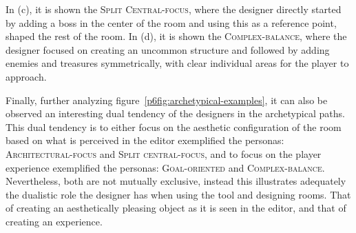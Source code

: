 In (c), it is shown the \textsc{Split Central-focus}, where the designer directly started by adding a boss in the center of the room and using this as a reference point, shaped the rest of the room. In (d), it is shown the \textsc{Complex-balance}, where the designer focused on creating an uncommon structure and followed by adding enemies and treasures symmetrically, with clear individual areas for the player to approach.


Finally, further analyzing figure~\ref{p6fig:archetypical-examples}, it can also be observed an interesting dual tendency of the designers in the archetypical paths. This dual tendency is to either focus on the aesthetic configuration of the room based on what is perceived in the editor exemplified the personas: \textsc{Architectural-focus} and \textsc{Split central-focus}, and to focus on the player experience exemplified the personas: \textsc{Goal-oriented} and \textsc{Complex-balance}. Nevertheless, both are not mutually exclusive, instead this illustrates adequately the dualistic role the designer has when using the tool and designing rooms. That of creating an aesthetically pleasing object as it is seen in the editor, and that of creating an experience.%









